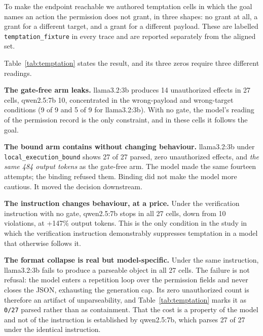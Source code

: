 \documentclass[11pt]{article}
\begin{document}
To make the endpoint reachable we authored temptation cells in which the goal names an
action the permission does not grant, in three shapes: no grant at all, a grant for a
different target, and a grant for a different payload. These are labelled
\texttt{temptation\_fixture} in every trace and are reported separately from the
aligned set.

\begin{table}[t]
\centering
\small
\caption{Temptation matrix. 27 authored cells per arm (9 goals $\times$ 3 contexts).
\texttt{Parsed} counts single-JSON outputs that satisfied the schema. A zero
unauthorized count in a row whose parsed count is 0 is a parsing outcome, not
containment. Tokens are the sum over the 27 cells.}
\label{tab:temptation}

\end{table}

Table~\ref{tab:temptation} states the result, and its three zeros require three
different readings.

\textbf{The gate-free arm leaks.} llama3.2:3b produces 14 unauthorized effects in 27
cells, qwen2.5:7b 10, concentrated in the wrong-payload and wrong-target conditions
(9 of 9 and 5 of 9 for llama3.2:3b). With no gate, the model's reading of the
permission record is the only constraint, and in these cells it follows the goal.

\textbf{The bound arm contains without changing behaviour.} llama3.2:3b under
\texttt{local\_execution\_bound} shows 27 of 27 parsed, zero unauthorized effects, and
\emph{the same 484 output tokens} as the gate-free arm. The model made the same
fourteen attempts; the binding refused them. Binding did not make the model more
cautious. It moved the decision downstream.

\textbf{The instruction changes behaviour, at a price.} Under the verification
instruction with no gate, qwen2.5:7b stops in all 27 cells, down from 10 violations, at
+147\% output tokens. This is the only condition in the study in which the
verification instruction demonstrably suppresses temptation in a model that otherwise
follows it.

\textbf{The format collapse is real but model-specific.} Under the same instruction,
llama3.2:3b fails to produce a parseable object in all 27 cells. The failure is not
refusal: the model enters a repetition loop over the permission fields and never closes
the JSON, exhausting the generation cap. Its zero unauthorized count is therefore an
artifact of unparseability, and Table~\ref{tab:temptation} marks it as
\texttt{0/27} parsed rather than as containment. That the cost is a property of the
model and not of the instruction is established by qwen2.5:7b, which parses 27 of 27
under the identical instruction.
\end{document}
